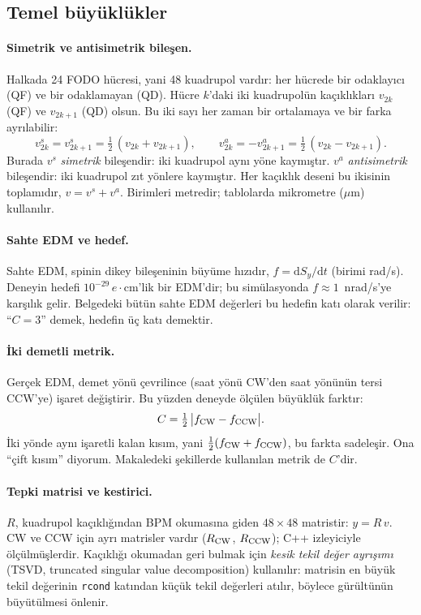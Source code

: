\documentclass[11pt,a4paper]{article}
\newcommand{\kod}[1]{{\XeTeXinterchartokenstate=0\texttt{#1}}}
\begin{document}
\subsection{Temel büyüklükler}

\paragraph{Simetrik ve antisimetrik bileşen.} Halkada 24 FODO hücresi, yani 48 kuadrupol vardır: her
hücrede bir odaklayıcı (QF) ve bir odaklamayan (QD). Hücre $k$'daki iki kuadrupolün kaçıklıkları
$v_{2k}$ (QF) ve $v_{2k+1}$ (QD) olsun. Bu iki sayı her zaman bir ortalamaya ve bir farka ayrılabilir:
\begin{equation}
v^{s}_{2k}=v^{s}_{2k+1}=\tfrac12\,(v_{2k}+v_{2k+1}),\qquad
v^{a}_{2k}=-v^{a}_{2k+1}=\tfrac12\,(v_{2k}-v_{2k+1}).
\end{equation}
Burada $v^s$ \emph{simetrik} bileşendir: iki kuadrupol aynı yöne kaymıştır. $v^a$ \emph{antisimetrik}
bileşendir: iki kuadrupol zıt yönlere kaymıştır. Her kaçıklık deseni bu ikisinin toplamıdır,
$v=v^s+v^a$. Birimleri metredir; tablolarda mikrometre ($\mu$m) kullanılır.

\paragraph{Sahte EDM ve hedef.} Sahte EDM, spinin dikey bileşeninin büyüme hızıdır, $f=\mathrm{d}S_y/\mathrm{d}t$
(birimi rad/s). Deneyin hedefi $10^{-29}\,e\cdot$cm'lik bir EDM'dir; bu simülasyonda
$f\approx 1$~nrad/s'ye karşılık gelir. Belgedeki bütün sahte EDM değerleri bu hedefin katı olarak verilir:
``$C=3$'' demek, hedefin üç katı demektir.

\paragraph{İki demetli metrik.} Gerçek EDM, demet yönü çevrilince (saat yönü CW'den saat yönünün tersi
CCW'ye) işaret değiştirir. Bu yüzden deneyde ölçülen büyüklük farktır:
\begin{equation}
C=\tfrac12\,\bigl|f_{\rm CW}-f_{\rm CCW}\bigr| .
\end{equation}
İki yönde aynı işaretli kalan kısım, yani $\tfrac12(f_{\rm CW}+f_{\rm CCW})$, bu farkta sadeleşir. Ona
``çift kısım'' diyorum. Makaledeki şekillerde kullanılan metrik de $C$'dir.

\paragraph{Tepki matrisi ve kestirici.} $R$, kuadrupol kaçıklığından BPM okumasına giden $48\times48$
matristir: $y=R\,v$. CW ve CCW için ayrı matrisler vardır ($R_{\rm CW}$, $R_{\rm CCW}$); C++ izleyiciyle
ölçülmüşlerdir. Kaçıklığı okumadan geri bulmak için \emph{kesik tekil değer ayrışımı} (TSVD, truncated
singular value decomposition) kullanılır: matrisin en büyük tekil değerinin \kod{rcond} katından küçük
tekil değerleri atılır, böylece gürültünün büyütülmesi önlenir.
\end{document}
